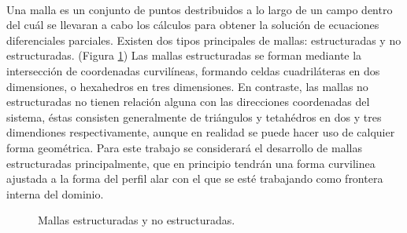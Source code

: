 \documentclass[letterpaper, openright, 12pt]{book}
\begin{document}
    \paragraph*{}
        Una malla es un conjunto de puntos destribuidos a lo largo de un campo
        dentro del cuál se llevaran a cabo los cálculos para obtener la solución
        de ecuaciones diferenciales parciales. Existen dos tipos principales de
        mallas: estructuradas y no estructuradas. (Figura \ref{fig:malla-estructurada-noestructurada})
        Las mallas estructuradas se forman mediante la intersección de
        coordenadas curvilíneas, formando celdas cuadriláteras en dos
        dimensiones, o hexahedros en tres dimensiones. En contraste, las mallas
        no estructuradas no tienen relación alguna con las direcciones
        coordenadas del sistema, éstas consisten generalmente de triángulos y
        tetahédros en dos y tres dimendiones respectivamente, aunque en realidad
        se puede hacer uso de calquier forma geométrica. Para este trabajo se
        considerará el desarrollo  de  mallas estructuradas principalmente, que
        en principio tendrán una forma curvilinea ajustada a la forma del perfil
        alar con el que se esté trabajando como frontera interna del dominio.
    \begin{figure}[htbp!]
        \centering
         \hspace{20mm} %
        \caption[Mallas estructuradas y no estructuradas]{Mallas estructuradas
        y no estructuradas.\cite{cengel}}
        \label{fig:malla-estructurada-noestructurada}
    \end{figure}
\end{document}
